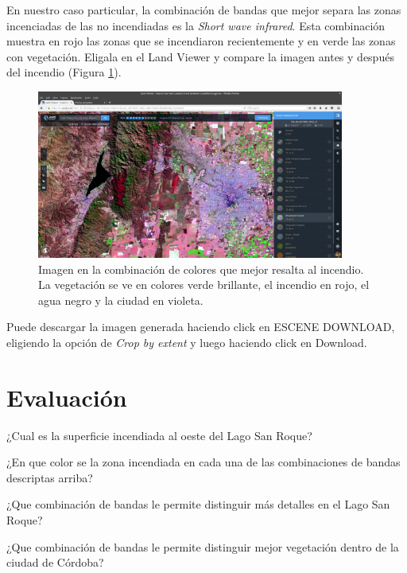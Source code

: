 \documentclass[a4paper,12pt]{book}
\begin{document}
En nuestro caso particular, la combinación de bandas que mejor separa las zonas incenciadas de las no incendiadas es la \emph{Short wave infrared}. Esta combinación muestra en rojo las zonas que se incendiaron recientemente y en verde las zonas con vegetación. Eligala en el Land Viewer y compare la imagen antes y después del incendio (Figura \ref{fig:incendio}).

\begin{figure}[h!]
    \centering
    \includegraphics[width=0.9\textwidth]{fig:incendio.png}
    \caption{Imagen en la combinación de colores que mejor resalta al incendio. La vegetación se ve en colores verde brillante, el incendio en rojo, el agua negro y la ciudad en violeta.}
    \label{fig:incendio}
\end{figure}

Puede descargar la imagen generada haciendo click en ESCENE DOWNLOAD, eligiendo la opción de \emph{Crop by extent} y luego haciendo click en Download.

\section{Evaluación}

\begin{que}
    ¿Cual es la superficie incendiada al oeste del Lago San Roque?
\end{que}

\begin{que}
    ¿En que color se la zona incendiada en cada una de las combinaciones de bandas descriptas arriba?
\end{que}

\begin{que}
    ¿Que combinación de bandas le permite distinguir más detalles en el Lago San Roque?
\end{que}

\begin{que}
    ¿Que combinación de bandas le permite distinguir mejor vegetación dentro de la ciudad de Córdoba?
\end{que}
\end{document}
